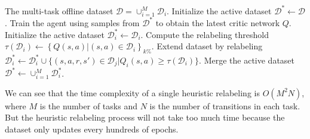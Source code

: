 \begin{algorithm}[H]
    \caption{Heuristic Relabeling}
    \label{alg:heuristic_relabeling}
    \begin{algorithmic}[1]
        \REQUIRE The multi-task offline dataset $\mathcal{D}=\cup_{i=1}^M \mathcal{D}_i$.
        \STATE Initialize the active dataset $\mathcal{D}^* \leftarrow \mathcal{D}$.
            \STATE Train the agent using samples from $\mathcal{D}^*$ to obtain the latest critic network $Q$.
                \STATE Initialize the active dataset $\mathcal{D}_i^* \leftarrow \mathcal{D}_i$.
                \STATE Compute the relabeling threshold $\tau(\mathcal{D}_i) \leftarrow \left\{ Q(s, a) | (s, a) \in \mathcal{D}_i \right\}_{k\%}$.
                    \STATE Extend dataset by relabeling $\mathcal{D}_i^* \leftarrow \mathcal{D}_i^* \cup \{(s, a, r, s') \in \mathcal{D}_j | Q_i(s, a) \geq \tau(\mathcal{D}_i)\}$.
                \ENDFOR
            \ENDFOR
            \STATE Merge the active dataset $\mathcal{D}^* \leftarrow \cup_{i=1}^M \mathcal{D}_i^*$.
        \ENDFOR
    \end{algorithmic}
\end{algorithm}

We can see that the time complexity of a single heuristic relabeling is $O(M^2N)$, where $M$ is the number of tasks and $N$ is the number of transitions in each task. But the heuristic relabeling process will not take too much time because the dataset only updates every hundreds of epochs.